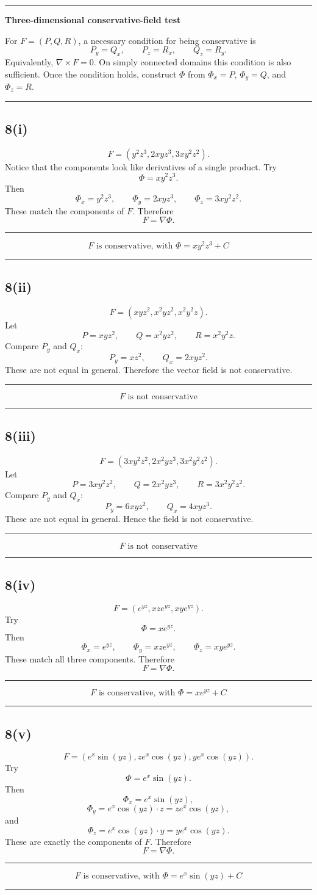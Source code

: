 \documentclass[11pt,a4paper]{article}
\newenvironment{methodbox}[1]{\par\medskip\noindent\begin{minipage}{\linewidth}\hrule\smallskip\textbf{#1}\par\smallskip}{\smallskip\hrule\end{minipage}\par\medskip}
\newenvironment{resultbox}{\par\medskip\noindent\begin{minipage}{\linewidth}\hrule\smallskip}{\smallskip\hrule\end{minipage}\par\medskip}
\newcommand{\ans}[1]{\begin{resultbox}\[\boxed{#1}\]\end{resultbox}}
\begin{document}
\begin{methodbox}{Three-dimensional conservative-field test}
For \(F=(P,Q,R)\), a necessary condition for being conservative is
\[
P_y=Q_x,
\qquad P_z=R_x,
\qquad Q_z=R_y.
\]
Equivalently, \(\nabla\times F=0\). On simply connected domains this condition is also sufficient. Once the condition holds, construct \(\Phi\) from \(\Phi_x=P\), \(\Phi_y=Q\), and \(\Phi_z=R\).
\end{methodbox}

\subsection*{8(i)}
\[
F=(y^2z^3,
2xyz^3,
3xy^2z^2).
\]
Notice that the components look like derivatives of a single product. Try
\[
\Phi=xy^2z^3.
\]
Then
\[
\Phi_x=y^2z^3,
\qquad
\Phi_y=2xyz^3,
\qquad
\Phi_z=3xy^2z^2.
\]
These match the components of \(F\). Therefore
\[
F=\nabla\Phi.
\]
\ans{F\text{ is conservative, with }\Phi=xy^2z^3+C}

\subsection*{8(ii)}
\[
F=(xyz^2,
 x^2yz^2,
 x^2y^2z).
\]
Let
\[
P=xyz^2,
\qquad Q=x^2yz^2,
\qquad R=x^2y^2z.
\]
Compare \(P_y\) and \(Q_x\):
\[
P_y=xz^2,
\qquad Q_x=2xyz^2.
\]
These are not equal in general. Therefore the vector field is not conservative.
\ans{F\text{ is not conservative}}

\subsection*{8(iii)}
\[
F=(3xy^2z^2,
2x^2yz^3,
3x^2y^2z^2).
\]
Let
\[
P=3xy^2z^2,
\qquad Q=2x^2yz^3,
\qquad R=3x^2y^2z^2.
\]
Compare \(P_y\) and \(Q_x\):
\[
P_y=6xyz^2,
\qquad Q_x=4xyz^3.
\]
These are not equal in general. Hence the field is not conservative.
\ans{F\text{ is not conservative}}

\subsection*{8(iv)}
\[
F=(e^{yz},
 xze^{yz},
 xye^{yz}).
\]
Try
\[
\Phi=xe^{yz}.
\]
Then
\[
\Phi_x=e^{yz},
\qquad
\Phi_y=xze^{yz},
\qquad
\Phi_z=xye^{yz}.
\]
These match all three components. Therefore
\[
F=\nabla\Phi.
\]
\ans{F\text{ is conservative, with }\Phi=xe^{yz}+C}

\subsection*{8(v)}
\[
F=(e^x\sin(yz),
 ze^x\cos(yz),
 ye^x\cos(yz)).
\]
Try
\[
\Phi=e^x\sin(yz).
\]
Then
\[
\Phi_x=e^x\sin(yz),
\]
\[
\Phi_y=e^x\cos(yz)\cdot z=ze^x\cos(yz),
\]
and
\[
\Phi_z=e^x\cos(yz)\cdot y=ye^x\cos(yz).
\]
These are exactly the components of \(F\). Therefore
\[
F=\nabla\Phi.
\]
\ans{F\text{ is conservative, with }\Phi=e^x\sin(yz)+C}
\end{document}
